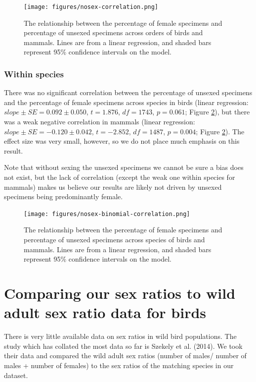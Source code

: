 \documentclass[a4paper, 12pt]{article}
\begin{document}
\begin{figure}[H]
 \centering
  \texttt{[image: figures/nosex-correlation.png]}
  \caption{The relationship between the percentage of female specimens and percentage of unsexed specimens across orders of birds and mammals. 
  Lines are from a linear regression, and shaded bars represent 95\% confidence intervals on the model.}
  \label{fig-nosex-correlation}
\end{figure}

\subsubsection*{Within species}
There was no significant correlation between the percentage of unsexed specimens and the percentage of female specimens across species in birds (linear regression: $slope \pm SE = 0.092 \pm 0.050$, $t = 1.876$, $df = 1743$, $p = 0.061$; Figure \ref{fig-nosex-correlation2}), but there was a weak negative correlation in mammals (linear regression: $slope \pm SE = -0.120 \pm 0.042$, $t = -2.852$, $df = 1487$, $p = 0.004$; Figure \ref{fig-nosex-correlation2}). 
The effect size was very small, however, so we do not place much emphasis on this result.

Note that without sexing the unsexed specimens we cannot be sure a bias does not exist, but the lack of correlation (except the weak one within species for mammals) makes us believe our results are likely not driven by unsexed specimens being predominantly female.

\begin{figure}[H]
 \centering
  \texttt{[image: figures/nosex-binomial-correlation.png]}
  \caption{The relationship between the percentage of female specimens and percentage of unsexed specimens across species of birds and mammals.
  Lines are from a linear regression, and shaded bars represent 95\% confidence intervals on the model.}
  \label{fig-nosex-correlation2}
\end{figure}

\newpage
\section{Comparing our sex ratios to wild adult sex ratio data for birds}

There is very little available data on sex ratios in wild bird populations. The study which has collated the most data so far is Szekely et al. (2014). We took their data and compared the wild adult sex ratios (number of males/ number of males + number of females) to the sex ratios of the matching species in our dataset.
\end{document}
